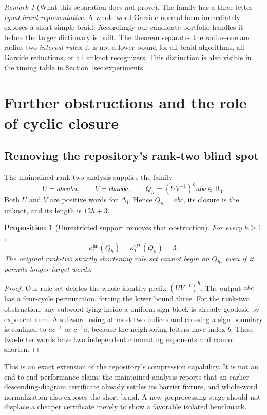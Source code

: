 \documentclass[11pt,a4paper]{article}
\newtheorem{proposition}[theorem]{Proposition}
\theoremstyle{definition}\newtheorem{definition}[theorem]{Definition}
\theoremstyle{remark}\newtheorem{remark}[theorem]{Remark}
\newcommand{\B}{\mathrm B}
\newcommand{\kc}[1]{\kappa^{\mathrm{cyc}}_{#1}}
\newcommand{\kl}[1]{\kappa^{\mathrm{lin}}_{#1}}
\begin{document}
\begin{remark}[What this separation does not prove]
The family has a three-letter \emph{equal braid representative}. A whole-word
Garside normal form immediately exposes a short simple braid. Accordingly
our candidate portfolio handles it before the larger dictionary is built.
The theorem separates the radius-one and radius-two \emph{interval rules};
it is not a lower bound for all braid algorithms, all Garside reductions,
or all unknot recognizers. This distinction is also visible in the timing
table in Section~\ref{sec:experiments}.
\end{remark}

\section{Further obstructions and the role of cyclic closure}

\subsection{Removing the repository's rank-two blind spot}
The maintained rank-two analysis supplies the family
\cite{ProveItRankTwo}
\[
 U=abcaba,\qquad V=cbacbc,\qquad Q_h=(UV^{-1})^h abc\in\B_4.
\]
Both $U$ and $V$ are positive words for $\Delta_4$. Hence $Q_h=abc$,
its closure is the unknot, and its length is $12h+3$.

\begin{proposition}[Unrestricted support removes that obstruction]
For every $h\ge1$,
\[
 \kl{1}(Q_h)=\kc{1}(Q_h)=3.
\]
The original rank-two strictly shortening rule set cannot begin on $Q_h$,
even if it permits longer target words.
\end{proposition}
\begin{proof}
Our rule set deletes the whole identity prefix $(UV^{-1})^h$. The output
$abc$ has a four-cycle permutation, forcing the lower bound three.
For the rank-two obstruction, any subword lying inside a uniform-sign
block is already geodesic by exponent sum. A subword using at most two
indices and crossing a sign boundary is confined to $ac^{-1}$ or
$c^{-1}a$, because the neighboring letters have index $b$. These two-letter
words have two independent commuting exponents and cannot shorten.
\end{proof}

This is an exact extension of the repository's compression capability.
It is not an end-to-end performance claim: the maintained analysis reports
that an earlier descending-diagram certificate already settles its barrier
fixture, and whole-word normalization also exposes the short braid. A new
preprocessing stage should not displace a cheaper certificate merely to
show a favorable isolated benchmark.
\end{document}
